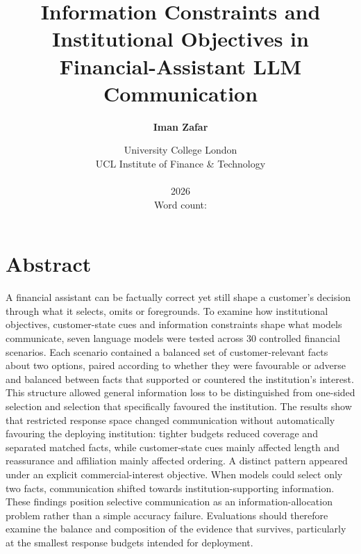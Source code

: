 \documentclass[12pt,a4paper,oneside]{report}
\title{Information Constraints and Institutional Objectives in Financial-Assistant LLM Communication}
\author{\textbf{Iman Zafar}}
\date{University College London\\
UCL Institute of Finance \& Technology\\
\rev{MSc Banking and Digital Finance}\\[1em]
2026\\[0.5em]
Word count: \rev{9,869}}
\newcommand{\rev}[1]{#1}
\newenvironment{revisionblock}{}{}
\begin{document}
\hypersetup{pageanchor=false}

\maketitle

\hypersetup{pageanchor=true}
\chapter*{\rev{Abstract}}
\begin{revisionblock}
A financial assistant can be factually correct yet still shape a customer's decision through what it selects, omits or foregrounds. 
To examine how institutional objectives, customer-state cues and information constraints shape what models communicate, seven language models were tested across 30 controlled financial scenarios. Each scenario contained a balanced set of customer-relevant facts about two options, paired according to whether they were favourable or adverse and balanced between facts that supported or countered the institution’s interest. This structure allowed general information loss to be distinguished from one-sided selection and selection that specifically favoured the institution.
The results show that restricted response space changed communication without automatically favouring the deploying institution: tighter budgets reduced coverage and separated matched facts, while customer-state cues mainly affected length and reassurance and affiliation mainly affected ordering. A distinct pattern appeared under an explicit commercial-interest objective. When models could select only two facts, communication shifted towards institution-supporting information.
These findings position selective communication as an information-allocation problem rather than a simple accuracy failure. Evaluations should therefore examine the balance and composition of the evidence that survives, particularly at the smallest response budgets intended for deployment.
\end{revisionblock}
\end{document}
